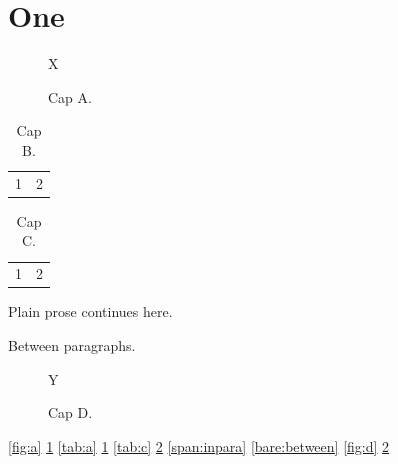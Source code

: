 \documentclass{article}
\begin{document}
\section{One}
\label{sec:one}

\begin{figure}
\centering
X\label{fig:inbody}
\caption{Cap A.}\label{fig:a}\label{fig:b}
\end{figure}

\begin{table}
\caption{Cap B.}\label{tab:a}\label{tab:b}
\begin{tabular}{cc}1&2\end{tabular}
\end{table}

\begin{table}
\begin{tabular}{cc}1&2\end{tabular}
\caption{Cap C.}
\label{tab:c}
\label{tab:d}
\end{table}

Plain prose\label{span:inpara} continues here.

\label{bare:between}

Between paragraphs.

\begin{figure}
\centering
Y
\caption{Cap D.}\label{fig:d}
\label{fig:e}
\end{figure}

\ref{fig:a} \ref{fig:b} \ref{tab:a} \ref{tab:b} \ref{tab:c} \ref{tab:d}
\ref{span:inpara} \ref{bare:between} \ref{fig:d} \ref{fig:e}
\end{document}

